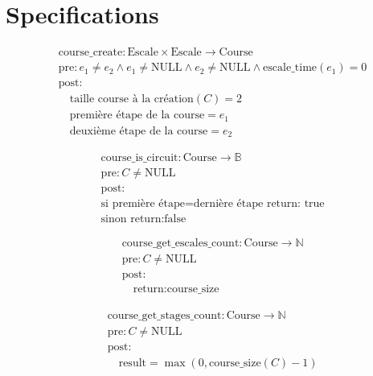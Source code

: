 \section{Specifications}\label{specifications}

\[
\begin{aligned}
&\text{course\_create}: \text{Escale} \times \text{Escale} \to \text{Course} \\
&\text{pre}: e_1 \neq e_2 \land e_1 \neq \text{NULL} \land e_2 \neq \text{NULL} \land \text{escale\_time}(e_1) = 0 \\
&\text{post}: \\
&\quad \text{taille course à la création}(C) = 2 \\
&\quad \text{première étape de la course} = e_1 \\
&\quad \text{deuxième  étape de la course} = e_2
\end{aligned}
\]

\[
\begin{aligned}
&\text{course\_is\_circuit}: \text{Course} \to \mathbb{B} \\
&\text{pre}: C \neq \text{NULL} \\
&\text{post}: \\
&\text{si } \text{première étape} = \text{dernière étape return: true} \\
&\text{sinon return:false}
\end{aligned}
\]




\[
\begin{aligned}
&\text{course\_get\_escales\_count}: \text{Course} \to \mathbb{N} \\
&\text{pre}: C \neq \text{NULL} \\
&\text{post}: \\
&\quad \text{return:} \text{course\_size}
\end{aligned}
\]





\[
\begin{aligned}
&\text{course\_get\_stages\_count}: \text{Course} \to \mathbb{N} \\
&\text{pre}: C \neq \text{NULL} \\
&\text{post}: \\
&\quad \text{result} = \max(0, \text{course\_size}(C) - 1)
\end{aligned}
\]





